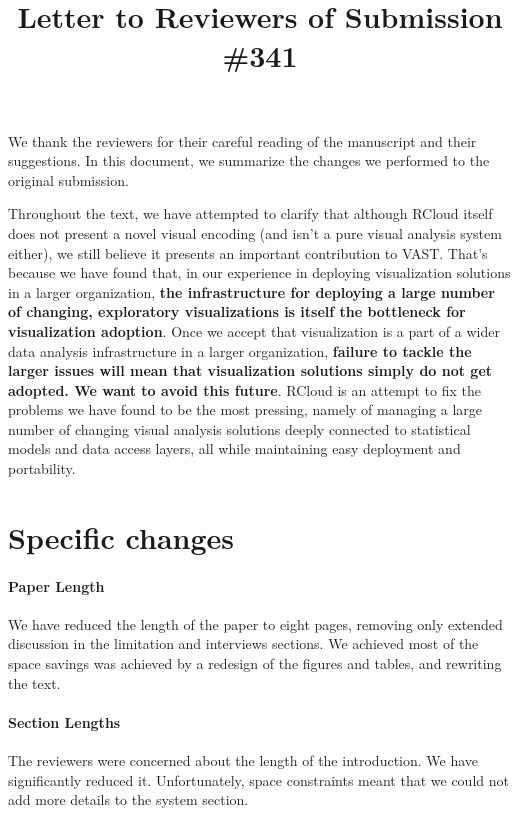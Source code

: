 \documentclass{article}
\title{Letter to Reviewers of Submission \#341}
\begin{document}
\maketitle

We thank the reviewers for their careful reading of the manuscript and
their suggestions. In this document, we summarize the changes we
performed to the original submission.

Throughout the text, we have attempted to clarify that although RCloud
itself does not present a novel visual encoding (and isn't a pure
visual analysis system either), we still believe it presents an
important contribution to VAST. That's because we have found that, in
our experience in deploying visualization solutions in a larger
organization, \textbf{the infrastructure for deploying a large number of
  changing, exploratory visualizations is itself the bottleneck for
  visualization adoption}. Once we accept that visualization is a part
of a wider data analysis infrastructure in a larger organization,
\textbf{failure to tackle the larger issues will mean that visualization
solutions simply do not get adopted. We want to avoid this future}.
RCloud is an attempt to fix the problems we have found to be the most
pressing, namely of managing a large number of changing visual
analysis solutions deeply connected to statistical models and data
access layers, all while maintaining easy deployment and portability.

\section*{Specific changes}

\paragraph*{Paper Length} We have reduced the length of the paper
to eight pages, removing only extended discussion in the limitation
and interviews sections. We achieved most of the space savings was
achieved by a redesign of the figures and tables, and rewriting
the text.

\paragraph*{Section Lengths} The reviewers were concerned about the length
of the introduction. We have significantly reduced it. Unfortunately,
space constraints meant that we could not add more details to the
system section.
\end{document}
